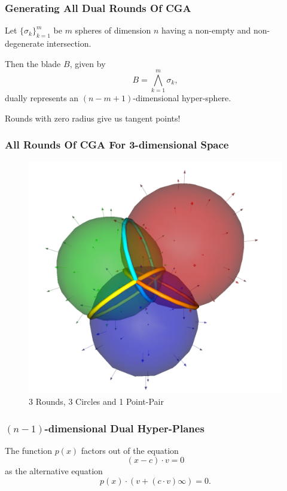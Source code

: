 \documentclass{beamer}
\newcommand{\nvai}{\infty}
\begin{document}
\begin{frame}
\frametitle{Generating All \alert{Dual Rounds} Of CGA}
Let $\{\sigma_k\}_{k=1}^m$ be $m$ spheres of dimension $n$ having a \alert{non-empty} and
\alert{non-degenerate} intersection.\pause

Then the blade $B$, given by
\begin{equation*}
B = \bigwedge_{k=1}^m\sigma_k,
\end{equation*}
\alert{dually} represents an $(n-m+1)$-dimensional hyper-sphere.\pause

\alert{Rounds} with zero radius give us \alert{tangent} points!
\end{frame}

\begin{frame}
\frametitle{All Rounds Of CGA For 3-dimensional Space}
\begin{figure}
\centering
\includegraphics[scale=0.2]{Rounds}
\caption{3 Rounds, 3 Circles and 1 Point-Pair}
\end{figure}
\end{frame}

\begin{frame}
\frametitle{$(n-1)$-dimensional \alert{Dual} Hyper-Planes}
The function $p(x)$ factors out of the equation
\begin{equation*}
(x-c)\cdot v = 0
\end{equation*}
as the alternative equation
\begin{equation*}
p(x)\cdot\left(v+(c\cdot v)\nvai\right) = 0.
\end{equation*}
\end{frame}
\end{document}
